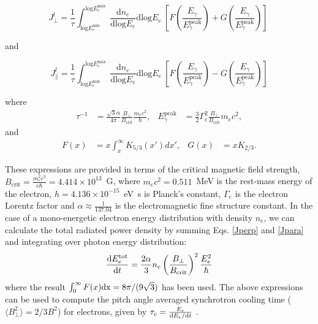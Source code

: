 \documentclass[usenatbib]{mnras}
\begin{document}
\begin{equation}
 {J_{\perp}^l} = \frac{1}{\tau}  \int_{\mathrm{log}E_e^{\mathrm{min}}}^{\mathrm{log}E_e^{\mathrm{max}}} \  \frac{\mathrm{d}n_e}{\mathrm{dlog}E_{e}} \mathrm{dlog}E_{e}\  \left[F\left(\frac{E_{\gamma}}{E_{\gamma}^{\mathrm{peak}}}\right) + G\left(\frac{E_{\gamma}}{E_{\gamma}^{\mathrm{peak}}}\right)\right] \
 \label{Jperp}
\end{equation}

\noindent and

\begin{equation}
{J_{\parallel}^l} = \frac{1}{\tau} \int_{\mathrm{log}E_e^{\mathrm{min}}}^{\mathrm{log}E_e^{\mathrm{max}}} \ \frac{\mathrm{d}n_e}{\mathrm{dlog}E_{e}} \mathrm{dlog}E_{e}\  \left[F\left(\frac{E_{\gamma}}{E_{\gamma}^{\mathrm{peak}}}\right) - G\left(\frac{E_{\gamma}}{E_{\gamma}^{\mathrm{peak}}}\right)\right] 
\label{Jpara}
\end{equation}

\noindent where
\begin{align}
\tau^{-1} &= \frac{\sqrt{3} \alpha}{4\pi}\frac{B_{\perp}}{B_{\mathrm{crit}}}\frac{m_{e}c^{2}}{\hbar},
 & 
E_{\gamma}^{\mathrm{peak}} &= \frac{3}{2}\Gamma_{e}^2 \frac{B_{\perp}}{B_{\mathrm{crit}}} m_{e} c^2,
\nonumber
\end{align}
and
\begin{align}
F(x) &= x \int_x^\infty K_{5/3}(x') dx', &
G(x) &= x K_{2/3}.
\nonumber
\end{align}

These expressions are provided in terms of the critical magnetic field strength, $B_{\mathrm{crit}} = \frac{m_e^2c^3}{e\hbar} = 4.414 \times 10^{13}$~G, where $m_e c^{2} = 0.511$~MeV is the rest-mass energy of the electron, $h = 4.136 \times 10^{-15}$~eV~s is Planck's constant, $\Gamma_{e}$ is the electron Lorentz factor and $\alpha \approx \frac{1}{137.04}$ is the electromagnetic fine structure constant. 
In the case of a mono-energetic electron energy distribution with density $n_{e}$, we can calculate the total radiated power density by summing Eqs. \ref{Jperp} and \ref{Jpara} and integrating over photon energy distribution:
\begin{equation}
\frac{{\rm d}E_e^{\rm tot}}{{\rm d}t} = \frac{2\alpha}{3} n_{e}\left(\frac{B_{\perp}}{B_{\rm crit}}\right)^{2}\frac{E_{e}^{2}}{\hbar}%
\label{Itot_l}
\end{equation}
where the result $\int_0^{\infty} F(x) \rm{d}x = 8\pi/(9\sqrt{3})$ \citep{1959ApJ...130..241W} has been used. The above expressions can be used to compute the pitch angle averaged synchrotron cooling time ($\langle B_{\perp}^{2}\rangle = 2/3 B^{2}$) for electrons, given by $\tau_c = \frac{E_e}{{\rm d}E_e/{\rm d}t}$ \citep{Taylor_Matthews}.
\end{document}
